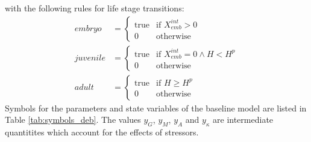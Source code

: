 \documentclass[preprint,12pt]{elsarticle}
\begin{document}
%
with the following rules for life stage transitions: 
%
\begin{align}
    embryo &= 
    \begin{cases}
        \text{true} & \text{if } X_{emb}^{int} > 0 \\
        0 & \text{otherwise}
    \end{cases} \\
    juvenile &= 
    \begin{cases}
        \text{true} & \text{if } X_{emb}^{int} = 0 \land H < H^p \\ 
        0 & \text{otherwise}
    \end{cases} \\
    adult &= 
    \begin{cases}
        \text{true} & \text{if } H \geq H^p \\ 
        0 & \text{otherwise}
    \end{cases}
    \label{eq:lifestages}
\end{align}%
%
Symbols for the parameters and state variables of the baseline model are listed in Table \ref{tab:symbols_deb}.
The values $y_G$, $y_M$, $y_A$ and $y_{\kappa}$ 
are intermediate quantitites which account for the effects of stressors.
\end{document}
